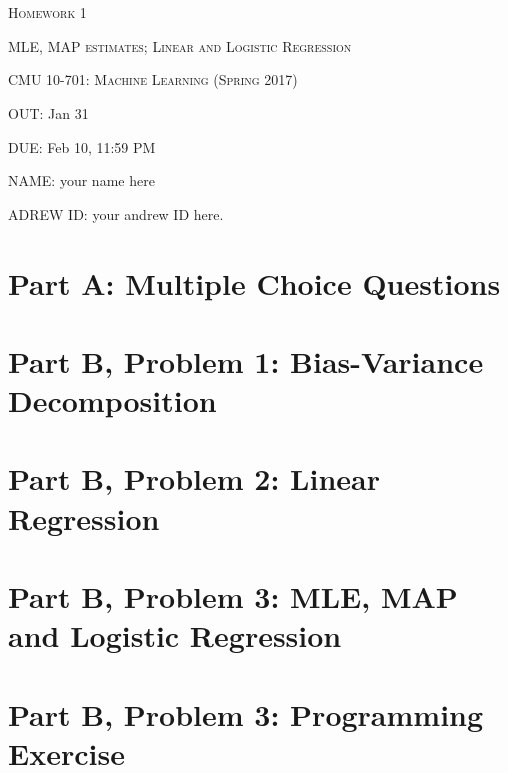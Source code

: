 \documentclass{article}
\begin{document}
\section*{}
\begin{center}
  \centerline{\textsc{\LARGE Homework 1}}
  \vspace{0.5em}
  \centerline{\textsc{\Large MLE, MAP estimates; Linear and Logistic Regression}}
  \vspace{1em}
  \textsc{\large CMU 10-701: Machine Learning (Spring 2017)} \\
  \vspace{1em}
  \centerline{OUT: Jan 31}
  \centerline{DUE: Feb 10, 11:59 PM}
  \centerline{NAME: your name here}
  \centerline{ADREW ID: your andrew ID here.}
	
\end{center}

\section*{Part A: Multiple Choice Questions}
\newpage

\section*{Part B, Problem 1: Bias-Variance Decomposition}
\newpage

\section*{Part B, Problem 2: Linear Regression}
\newpage

\section*{Part B, Problem 3: MLE, MAP and Logistic Regression}
\newpage

\section*{Part B, Problem 3: Programming Exercise}
\newpage
\end{document}
